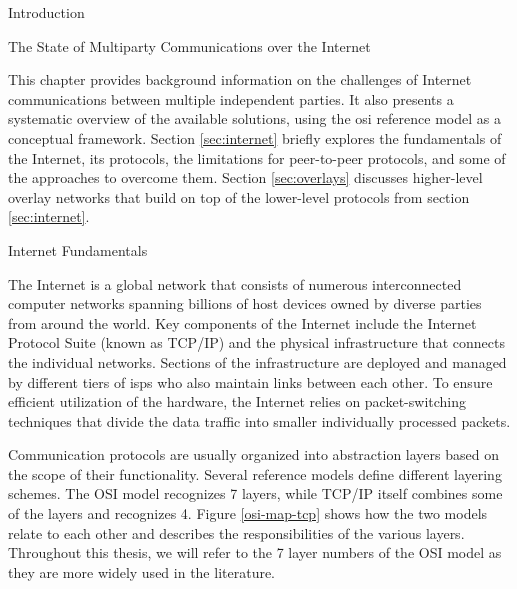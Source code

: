 \begin{frame}
\tableofcontents

\printnoidxglossary[type=\acronymtype,title=List of Abbreviations]
\listoffigures

\mainmatter

\begin{block}{Introduction}
\protect\hypertarget{introduction}{}
\end{block}
\end{frame}

\begin{frame}[fragile]{The State of Multiparty Communications over the
Internet}
\protect\hypertarget{the-state-of-multiparty-communications-over-the-internet}{}

This chapter provides background information on the challenges of
Internet communications between multiple independent parties. It also
presents a systematic overview of the available solutions, using the
\gls{osi} reference model as a conceptual framework. Section
\ref{sec:internet} briefly explores the fundamentals of the Internet,
its protocols, the limitations for peer-to-peer protocols, and some of
the approaches to overcome them. Section \ref{sec:overlays} discusses
higher-level overlay networks that build on top of the lower-level
protocols from section \ref{sec:internet}.

\begin{block}{Internet Fundamentals}
\protect\hypertarget{sec:internet}{}

The Internet is a global network that consists of numerous
interconnected computer networks spanning billions of host devices owned
by diverse parties from around the world. Key components of the Internet
include the Internet Protocol Suite (known as TCP/IP) and the physical
infrastructure that connects the individual networks. Sections of the
infrastructure are deployed and managed by different tiers of
\glspl{isp} who also maintain links between each other. To ensure
efficient utilization of the hardware, the Internet relies on
packet-switching techniques that divide the data traffic into smaller
individually processed packets.

Communication protocols are usually organized into abstraction layers
based on the scope of their functionality. Several reference models
define different layering schemes. The OSI model recognizes 7 layers,
while TCP/IP itself combines some of the layers and recognizes 4. Figure
\ref{osi-map-tcp} shows how the two models relate to each other and
describes the responsibilities of the various layers. Throughout this
thesis, we will refer to the 7 layer numbers of the OSI model as they
are more widely used in the literature.


\end{block}
\end{frame}
